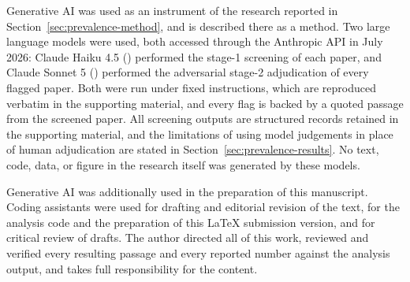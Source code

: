 Generative AI was used as an instrument of the research reported in
Section~\ref{sec:prevalence-method}, and is described there as a method. Two
large language models were used, both accessed through the Anthropic API in
July 2026: Claude Haiku 4.5 () performed the
stage-1 screening of each paper, and Claude Sonnet 5
() performed the adversarial stage-2 adjudication of
every flagged paper. Both were run under fixed instructions, which are
reproduced verbatim in the supporting material, and every flag is backed by a
quoted passage from the screened paper. All screening outputs are structured
records retained in the supporting material, and the limitations of using model
judgements in place of human adjudication are stated in
Section~\ref{sec:prevalence-results}. No text, code, data, or figure in the
research itself was generated by these models.

Generative AI was additionally used in the preparation of this manuscript.
Coding
assistants were used for drafting and editorial revision of the text, for the
analysis code and the preparation of this \LaTeX{} submission version, and for
critical review of drafts. The author directed all of this work, reviewed and
verified every resulting passage and every reported number against the
analysis output, and takes full responsibility for the content.
